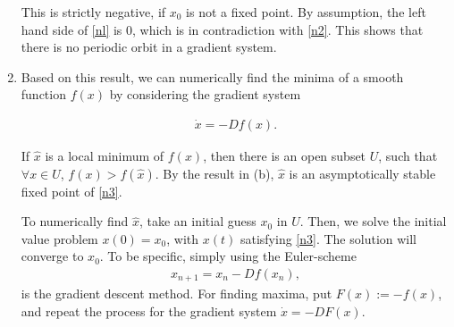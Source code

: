 \begin{solution}[8.6]
\begin{enumerate}
This is strictly negative, if $x_0$ is not a fixed point. By assumption, the left hand side of \eqref{nl} is 0, which is in contradiction with \eqref{n2}. This shows that there is no periodic orbit in a gradient system.

\item Based on this result, we can numerically find the minima of a smooth function $f(x)$ by considering the gradient system

\begin{align}
\dot{x} = - Df(x). \label{n3}
\end{align}


If $\hat{x}$ is a local minimum of $f(x)$, then there is an open subset $U$, such that 
$\forall x\in U$, $f(x)>f(\hat{x})$. By the result in (b), $\hat{x}$ is an asymptotically stable fixed point of \eqref{n3}. 

To numerically find $\hat{x}$, take an initial guess $x_0$ in $U$. Then, we solve the initial value problem $x(0)=x_0$, with $x(t)$ satisfying \eqref{n3}. The solution will converge to $x_0$. To be specific, simply using the Euler-scheme
\begin{align}
x_{n+1} = x_{n} - Df(x_{n}),
\end{align}
is the gradient descent method. For finding maxima, put $F(x):=-f(x)$, and repeat the process for the gradient system $\dot{x} = -DF(x)$.
\end{enumerate}
\end{solution}

